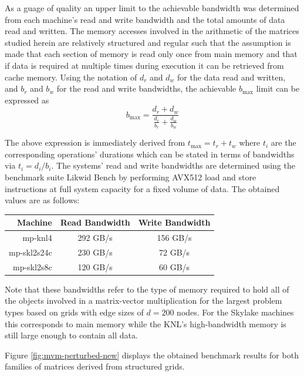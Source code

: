     As a guage of quality an upper limit to the achievable bandwidth was determined from each machine's read and write
    bandwidth and the total amounts of data read and written. The memory accesses involved in the arithmetic of the
    matrices studied herein are relatively structured and regular such that the assumption is made that each section of
    memory is read only once from main memory and that if data is required at multiple times during execution it can be
    retrieved from cache memory. Using the notation of $d_r$ and $d_w$ for the data read and written, and $b_r$ and
    $b_w$ for the read and write bandwidths, the achievable $b_\text{max}$ limit can be expressed as
    $$
      b_{\text{max}} = \frac{d_r + d_w}{\frac{d_r}{b_r} + \frac{d_w}{b_w}}
    $$

    The above expression is immediately derived from $t_\text{max} = t_r + t_w$ where $t_i$ are the corresponding
    operations' durations which can be stated in terms of bandwidths via $t_i = d_i / b_i$. The systems' read and write
    bandwidths are determined using the benchmark suite Likwid Bench \cite{likwidbench:github} by performing AVX512 load
    and store instructions at full system capacity for a fixed volume of data. The obtained values are as follows:

    \begin{center}
    \begin{tabular}{r|c|c}
      \textbf{Machine} & \textbf{Read Bandwidth} & \textbf{Write Bandwidth} \\
      \hline
      mp-knl4     & 292 GB/s & 156 GB/s \\
      mp-skl2s24c & 230 GB/s & 72 GB/s  \\
      mp-skl2s8c  & 120 GB/s & 60 GB/s  \\
    \end{tabular}
    \end{center}

    Note that these bandwidths refer to the type of memory required to hold all of the objects involved in a
    matrix-vector multiplication for the largest problem types based on grids with edge sizes of $d = 200$ nodes. For
    the Skylake machines this corresponds to main memory while the KNL's high-bandwidth memory is still large enough to
    contain all data. 

    Figure \ref{fig:mvm-perturbed-new} displays the obtained benchmark results for both families of matrices derived
    from structured grids.

